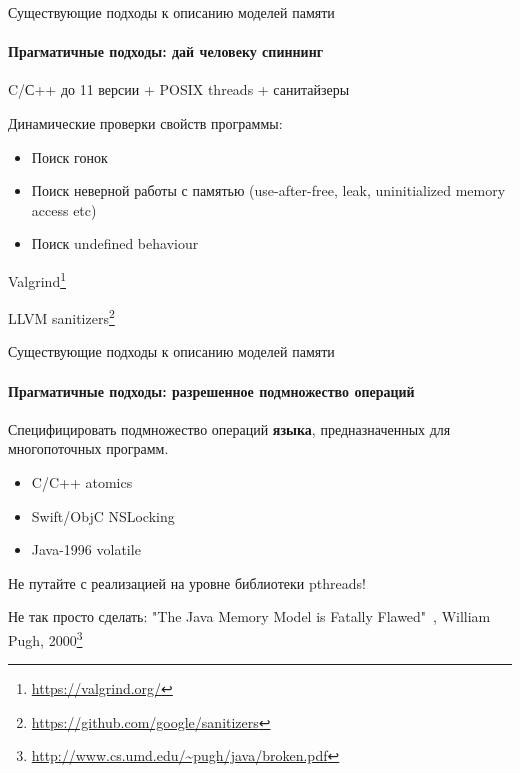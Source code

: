 \begin{frame}[t, noframenumbering]{Существующие подходы к описанию моделей памяти}
\framesubtitle{Прагматичные подходы: дай человеку спиннинг}

C/С++ до 11 версии + POSIX threads + санитайзеры

Динамические проверки свойств программы:
\begin{itemize}
	\item Поиск гонок
	\item Поиск неверной работы с памятью (use-after-free, leak, uninitialized memory access etc)
	\item Поиск undefined behaviour
\end{itemize}

Valgrind\footnote{\tiny\url{https://valgrind.org/}}

LLVM sanitizers\footnote{\tiny\url{https://github.com/google/sanitizers}}

\end{frame}


\begin{frame}{Существующие подходы к описанию моделей памяти}
\framesubtitle{Прагматичные подходы: разрешенное подмножество операций}

Специфицировать подмножество операций \textbf{языка}, предназначенных для многопоточных программ.

\begin{itemize}
\pause
\item C/C++ atomics

\pause
\item Swift/ObjC NSLocking

\pause
\item Java-1996 volatile
\end{itemize}

\pause
Не путайте с реализацией на уровне библиотеки pthreads!

\pause
Не так просто сделать: "The Java Memory Model is Fatally Flawed"\ , William Pugh, 2000\footnote<6->{\tiny\url{http://www.cs.umd.edu/~pugh/java/broken.pdf}}

\end{frame}


